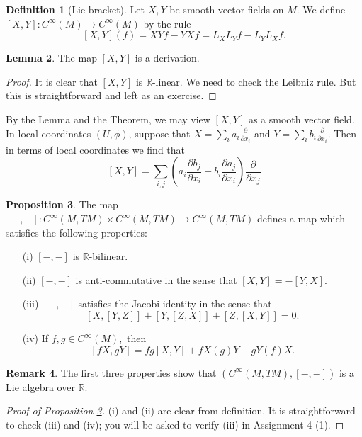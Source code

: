 \documentclass{amsart}
\numberwithin{equation}{section}
\theoremstyle{definition}
\newtheorem{definition}{Definition} [section]
\newtheorem{remark}[definition]{Remark}
\theoremstyle{theorem}
\newtheorem{proposition}[definition]{Proposition}
\newtheorem{lemma}[definition]{Lemma}
\begin{document}
\begin{definition}[Lie bracket]
Let $X,Y$ be smooth vector fields on $M$. We define $[X,Y] : C^\infty(M) \to C^\infty(M)$ by the rule 
\[
[X,Y](f) = XYf - YXf = L_XL_Yf - L_YL_Xf.
\]
\end{definition}

\begin{lemma}
The map $[X,Y]$ is a derivation. 
\end{lemma}

\begin{proof}
It is clear that $[X,Y]$ is $\mathbb{R}$-linear. We need to check the Leibniz rule. But this is straightforward and left as an exercise.  
\end{proof}

By the Lemma and the Theorem, we may view $[X,Y]$ as a smooth vector field. In local coordinates $(U,\phi)$, suppose that $X = \sum_{i}a_i \frac{\partial}{\partial x_i}$ and $Y = \sum_{i} b_i \frac{\partial}{\partial x_i}$. Then in terms of local coordinates we find that 
\[
[X,Y] = \sum_{i,j}\left(a_i \frac{\partial b_j}{\partial x_i} - b_i \frac{\partial a_j}{\partial x_i}\right) \frac{\partial}{\partial x_j}
\]

\begin{proposition}\label{Lie-bracket}
The map $[-,-] : C^\infty(M,TM) \times C^\infty(M,TM) \to C^\infty(M,TM)$ defines a map which satisfies the following properties:
\begin{enumerate}
\item[(i)] $[-,-]$ is $\mathbb{R}$-bilinear. 
\item[(ii)] $[-,-]$ is anti-commutative in the sense that $[X,Y] = -[Y,X]$. 
\item[(iii)] $[-,-]$ satisfies the Jacobi identity in the sense that 
\[
[X,[Y,Z]] + [Y,[Z,X]] + [Z,[X,Y]] = 0.
\]
\item[(iv)]  If $f,g \in C^\infty(M),$ then 
\[
[fX, gY] = fg[X,Y] + f X(g)Y - gY(f)X.
\]
\end{enumerate}
\end{proposition}

\begin{remark}
The first three properties show that $(C^\infty(M,TM), [-,-])$ is a Lie algebra over $\mathbb{R}$. 
\end{remark}

\begin{proof}[Proof of Proposition \ref{Lie-bracket}]
(i) and (ii) are clear from definition. It is straightforward to check (iii) and (iv); you will be asked
to verify (iii) in Assignment 4 (1). 
\end{proof}
\end{document}
